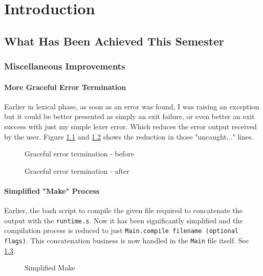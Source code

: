 \chapter{Introduction}
\hspace{3mm}

\section{What Has Been Achieved This Semester}

\subsection{Miscellaneous Improvements}

\subsubsection{More Graceful Error Termination}

Earlier in lexical phase, as soon as an error was found, I was raising an exception but it could be better presented as simply an exit failure, or even better an exit success with just my simple lexer error. Which reduces the error output received by the user. Figure \ref{fig:gr1} and \ref{fig:gr2} shows the reduction in those "uncaught..." lines.

\begin{figure}
\centering
{}
\caption{Graceful error termination - before}
\label{fig:gr1}
\end{figure}
\begin{figure}
\centering
{}
\caption{Graceful error termination - after}
\label{fig:gr2}
\end{figure}

\subsubsection{Simplified "Make" Process}

Earlier, the bash script to compile the given file required to concatenate the output with the \texttt{runtime.s}. Now it has been significantly simplified and the compilation process is reduced to just \texttt{Main.compile filename (optional flags)}. This concatenation business is now handled in the \texttt{Main} file itself. See \ref{fig:sm}.

\begin{figure}
\centering
{}
\caption{Simplified Make}
\label{fig:sm}
\end{figure}

